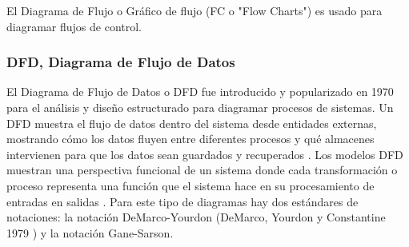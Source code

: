 El Diagrama de Flujo o Gráfico de flujo (FC o "Flow Charts") es usado para diagramar flujos de control.

\subsubsection{DFD, Diagrama de Flujo de Datos}

El Diagrama de Flujo de Datos o DFD fue introducido y popularizado en 1970 para el análisis y diseño estructurado \cite{Gane-Sarson-1979} para diagramar procesos de sistemas. Un DFD muestra el flujo de datos dentro del sistema desde entidades externas, mostrando cómo los datos fluyen entre diferentes procesos y qué almacenes intervienen para que los datos sean guardados y recuperados \cite{Scott-Ambler-2004}. Los modelos DFD muestran una perspectiva funcional de un sistema donde cada transformación o proceso representa una función que el sistema hace en su procesamiento de entradas en salidas \cite{Sommerville-2006}.\newline
Para este tipo de diagramas hay dos estándares de notaciones: la notación DeMarco-Yourdon (DeMarco, Yourdon y Constantine 1979 \cite{Dixit-2007}) y la notación Gane-Sarson.\newline
\newline


